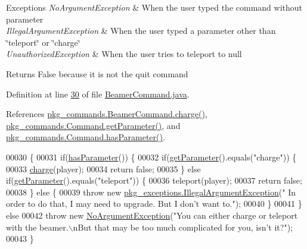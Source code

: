 \begin{DoxyExceptions}{Exceptions}
{\em No\-Argument\-Exception} & When the user typed the command without parameter \\
\hline
{\em Illegal\-Argument\-Exception} & When the user typed a parameter other than \char`\"{}teleport\char`\"{} or \char`\"{}charge\char`\"{} \\
\hline
{\em Unauthorized\-Exception} & When the user tries to teleport to null \\
\hline
\end{DoxyExceptions}
\begin{DoxyReturn}{Returns}
False because it is not the quit command 
\end{DoxyReturn}


Definition at line \hyperlink{BeamerCommand_8java_source_l00030}{30} of file \hyperlink{BeamerCommand_8java_source}{Beamer\-Command.\-java}.



References \hyperlink{BeamerCommand_8java_source_l00067}{pkg\-\_\-commands.\-Beamer\-Command.\-charge()}, \hyperlink{Command_8java_source_l00034}{pkg\-\_\-commands.\-Command.\-get\-Parameter()}, and \hyperlink{Command_8java_source_l00050}{pkg\-\_\-commands.\-Command.\-has\-Parameter()}.


\begin{DoxyCode}
00030                                                                                                            
                              \{
00031         \textcolor{keywordflow}{if}(\hyperlink{classpkg__commands_1_1Command_a02af95ab3f1898a66259ab7c177b6998}{hasParameter}()) \{
00032             \textcolor{keywordflow}{if}(\hyperlink{classpkg__commands_1_1Command_a41c92d445be73ea9d62320c65efb8434}{getParameter}().equals(\textcolor{stringliteral}{"charge"})) \{
00033                 \hyperlink{classpkg__commands_1_1BeamerCommand_ae71665296a18d581ad1f714c1078e37b}{charge}(player);
00034                 \textcolor{keywordflow}{return} \textcolor{keyword}{false};
00035             \} \textcolor{keywordflow}{else} \textcolor{keywordflow}{if}(\hyperlink{classpkg__commands_1_1Command_a41c92d445be73ea9d62320c65efb8434}{getParameter}().equals(\textcolor{stringliteral}{"teleport"})) \{
00036                 teleport(player);
00037                 \textcolor{keywordflow}{return} \textcolor{keyword}{false};
00038             \} \textcolor{keywordflow}{else} \{
00039                 \textcolor{keywordflow}{throw} \textcolor{keyword}{new} \hyperlink{classpkg__exceptions_1_1IllegalArgumentException}{pkg\_exceptions.IllegalArgumentException}(\textcolor{stringliteral}{"
      In order to do that, I may need to upgrade. But I don't want to."});
00040             \}
00041         \} \textcolor{keywordflow}{else} 
00042             \textcolor{keywordflow}{throw} \textcolor{keyword}{new} \hyperlink{classpkg__exceptions_1_1NoArgumentException}{NoArgumentException}(\textcolor{stringliteral}{"You can either charge or teleport with the
       beamer.\(\backslash\)nBut that may be too much complicated for you, isn't it?"});
00043     \}
\end{DoxyCode}


